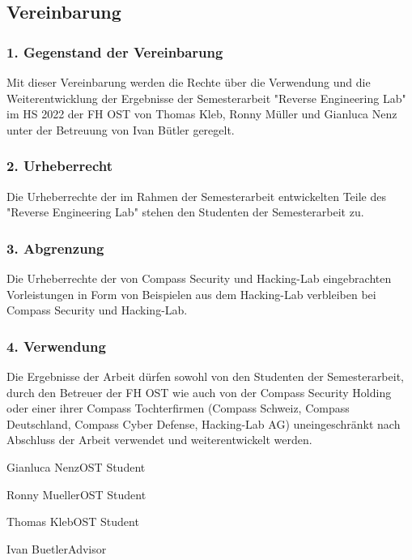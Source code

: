\subsection*{Vereinbarung}
\subsubsection*{1. Gegenstand der Vereinbarung}
Mit dieser Vereinbarung werden die Rechte über die Verwendung und die Weiterentwicklung der Ergebnisse der Semesterarbeit "Reverse Engineering Lab" im HS 2022 der FH OST von Thomas Kleb, Ronny Müller und Gianluca Nenz unter der Betreuung von Ivan Bütler geregelt. \\

\vspace{-2ex}
\subsubsection*{2. Urheberrecht}
Die Urheberrechte der im Rahmen der Semesterarbeit entwickelten Teile des "Reverse Engineering Lab" stehen den Studenten der Semesterarbeit zu.\\

\vspace{-2ex}
\subsubsection*{3. Abgrenzung}
Die Urheberrechte der von Compass Security und Hacking-Lab eingebrachten Vorleistungen in Form von Beispielen aus dem Hacking-Lab verbleiben bei Compass Security und Hacking-Lab. \\

\vspace{-2ex}
\subsubsection*{4. Verwendung}
Die Ergebnisse der Arbeit dürfen sowohl von den Studenten der Semesterarbeit, durch den Betreuer der FH OST wie auch von der Compass Security Holding oder einer ihrer Compass Tochterfirmen (Compass Schweiz, Compass Deutschland, Compass Cyber Defense, Hacking-Lab AG) uneingeschränkt nach Abschluss der Arbeit verwendet und weiterentwickelt werden. \\

\vspace{-2ex}
\signature{resources/sig_ivan.png}{Gianluca Nenz}{OST Student}\hfill\signature{resources/sig_ivan.png}{Ronny Mueller}{OST Student}

\signature{resources/sig_ivan.png}{Thomas Kleb}{OST Student}\hfill \signature{resources/sig_ivan.png}{Ivan Buetler}{Advisor}

